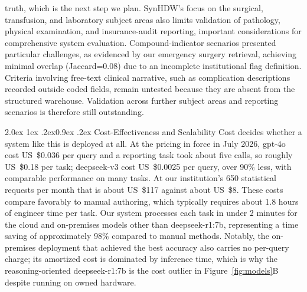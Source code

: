 \documentclass[10pt]{article}
\makeatletter
\renewcommand\subsection{\@startsection{subsection}{2}{\z@}%
  {2.0ex \@plus 1ex \@minus .2ex}{0.9ex \@plus .2ex}%
  {\normalfont\normalsize\bfseries}}
\makeatother
\begin{document}
truth, which is the next step we plan. SynHDW's
focus on the surgical, transfusion, and laboratory subject areas also limits
validation of pathology, physical examination, and insurance-audit reporting,
important considerations for comprehensive system evaluation. Compound-indicator
scenarios presented particular challenges, as evidenced by our emergency surgery
retrieval, achieving minimal overlap (Jaccard=0.08) due to an incomplete
institutional flag definition. Criteria involving free-text clinical narrative,
such as complication descriptions recorded outside coded fields, remain untested
because they are absent from the structured warehouse. Validation across further subject areas and reporting scenarios is therefore still outstanding.

\subsection{Cost-Effectiveness and Scalability}
Cost decides whether a system like this is deployed at all. At the pricing in force in July 2026, gpt-4o cost US~\$0.036 per query and a reporting task took about five calls, so roughly US~\$0.18 per task; deepseek-v3 cost US~\$0.0025 per query, over 90\% less, with comparable performance on many tasks. At our institution's 650 statistical requests per month that is about US~\$117 against about US~\$8. These costs compare favorably to manual authoring, which typically
requires about 1.8 hours of engineer time per task. Our system processes
each task in under 2 minutes for the cloud and on-premises models other than
deepseek-r1:7b, representing a time saving of approximately 98\% compared to
manual methods. Notably, the on-premises deployment that achieved the best
accuracy also carries no per-query charge; its amortized cost is dominated by
inference time, which is why the reasoning-oriented deepseek-r1:7b is the cost
outlier in Figure~\ref{fig:models}B despite running on owned hardware.
\end{document}
